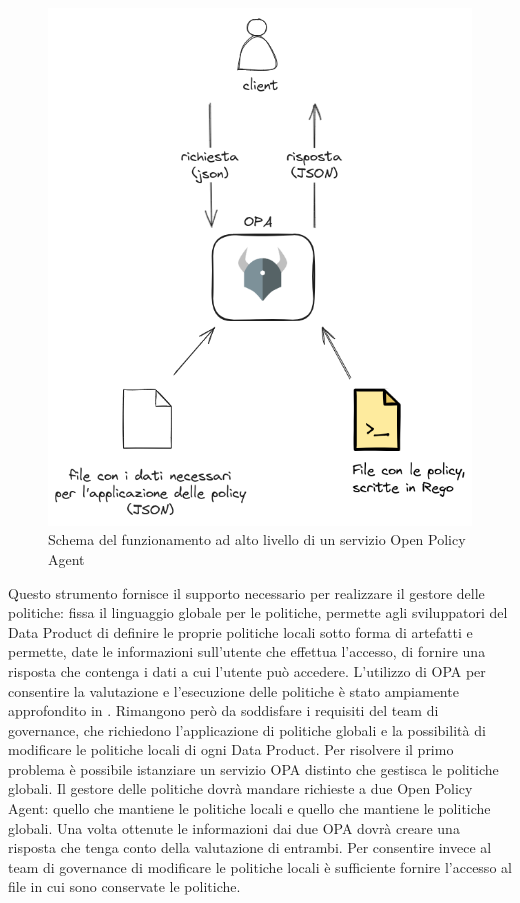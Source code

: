 \documentclass[12pt]{report}
\begin{document}
\begin{figure}[t]
    \centering
    \includegraphics[width= 0.75\linewidth]{immagini/Opa funzionamento.png}
    \caption{Schema del funzionamento ad alto livello di un servizio Open Policy Agent}
    \label{OPA image}
\end{figure}
Questo strumento fornisce il supporto necessario per realizzare il gestore delle politiche: fissa il linguaggio globale per le politiche, permette agli sviluppatori del Data Product di definire le proprie politiche locali sotto forma di artefatti e permette, date le informazioni sull'utente che effettua l'accesso, di fornire una risposta che contenga i dati a cui l'utente può accedere.
L'utilizzo di OPA per consentire la valutazione e l'esecuzione delle politiche è stato ampiamente approfondito in \cite{caronni2022framework}.
Rimangono però da soddisfare i requisiti del team di governance, che richiedono l'applicazione di politiche globali e la possibilità di modificare le politiche locali di ogni Data Product.
Per risolvere il primo problema è possibile istanziare un servizio OPA distinto che gestisca le politiche globali.
Il gestore delle politiche dovrà mandare richieste a due Open Policy Agent: quello che mantiene le politiche locali e quello che mantiene le politiche globali.
Una volta ottenute le informazioni dai due OPA dovrà creare una risposta che tenga conto della valutazione di entrambi.
Per consentire invece al team di governance di modificare le politiche locali è sufficiente fornire l'accesso al file in cui sono conservate le politiche.
\end{document}
